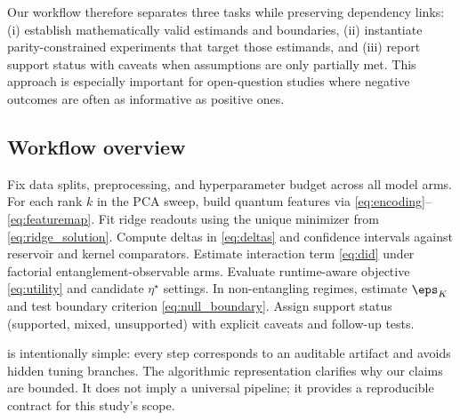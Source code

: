 \documentclass{article} %
\begin{document}
Our workflow therefore separates three tasks while preserving dependency links: (i) establish mathematically valid estimands and boundaries, (ii) instantiate parity-constrained experiments that target those estimands, and (iii) report support status with caveats when assumptions are only partially met. This approach is especially important for open-question studies where negative outcomes are often as informative as positive ones.

\subsection{Workflow overview}
\begin{algorithm}[t]
\caption{Parity-Constrained QRC Evaluation Workflow}
\label{alg:workflow}
\begin{algorithmic}[1]
\STATE Fix data splits, preprocessing, and hyperparameter budget across all model arms.
\STATE For each rank $k$ in the PCA sweep, build quantum features via \eqref{eq:encoding}--\eqref{eq:featuremap}.
\STATE Fit ridge readouts using the unique minimizer from \eqref{eq:ridge_solution}.
\STATE Compute deltas in \eqref{eq:deltas} and confidence intervals against reservoir and kernel comparators.
\STATE Estimate interaction term \eqref{eq:did} under factorial entanglement-observable arms.
\STATE Evaluate runtime-aware objective \eqref{eq:utility} and candidate $\eta^\star$ settings.
\STATE In non-entangling regimes, estimate $\eps_K$ and test boundary criterion \eqref{eq:null_boundary}.
\STATE Assign support status (supported, mixed, unsupported) with explicit caveats and follow-up tests.
\end{algorithmic}
\end{algorithm}

 is intentionally simple: every step corresponds to an auditable artifact and avoids hidden tuning branches. The algorithmic representation clarifies why our claims are bounded. It does not imply a universal pipeline; it provides a reproducible contract for this study's scope.
\end{document}
